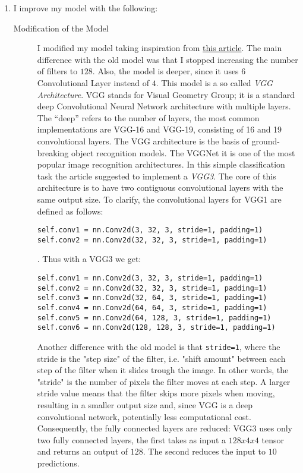 \documentclass[a4paper]{article}
\begin{document}
\begin{enumerate}
       	\item  I improve my model with the following:
 \begin{description}
     \item[Modification of the Model] I modified my model taking inspiration from \href{https://machinelearningmastery.com/how-to-develop-a-cnn-from-scratch-for-cifar-10-photo-classification/}{this article}. The main difference with the old model was that I stopped increasing the number of filters to $128$. Also, the model is deeper, since it uses $6$ Convolutional Layer instead of $4$. This model is a so called \textit{VGG Architecture}. VGG stands for Visual Geometry Group; it is a standard deep Convolutional Neural Network architecture with multiple layers. The “deep” refers to the number of layers, the most common implementations are  VGG-16 and VGG-19, consisting of 16 and 19 convolutional layers. The VGG architecture is the basis of ground-breaking object recognition models. The VGGNet it is one of the most popular image recognition architectures. In this simple classification task the article suggested to implement a \textit{VGG3}. The core of this architecture is to have two contiguous convolutional layers with the same output size. To clarify, the convolutional layers for VGG1 are defined as follows:
     \begin{lstlisting}
self.conv1 = nn.Conv2d(3, 32, 3, stride=1, padding=1)
self.conv2 = nn.Conv2d(32, 32, 3, stride=1, padding=1)
     \end{lstlisting}. 
     Thus with a VGG3 we get:
      \begin{lstlisting}
self.conv1 = nn.Conv2d(3, 32, 3, stride=1, padding=1)
self.conv2 = nn.Conv2d(32, 32, 3, stride=1, padding=1)
self.conv3 = nn.Conv2d(32, 64, 3, stride=1, padding=1)
self.conv4 = nn.Conv2d(64, 64, 3, stride=1, padding=1)
self.conv5 = nn.Conv2d(64, 128, 3, stride=1, padding=1)
self.conv6 = nn.Conv2d(128, 128, 3, stride=1, padding=1)
     \end{lstlisting}
Another difference with the old model is that \texttt{stride=1}, where the stride is the "step size" of the filter, i.e. "shift amount" between each step of the filter when it slides trough the image. In other words, the "stride" is the number of pixels the filter moves at each step. A larger stride value means that the filter skips more pixels when moving, resulting in a smaller output size and, since VGG is a deep convolutional network, potentially less computational cost. Consequently, the fully connected layers are reduced: VGG3 uses only two fully connected layers, the first takes as input a $128x4x4$ tensor and returns an output of $128$. The second reduces the input to $10$ predictions.

\end{description}
\end{enumerate}
\end{document}
